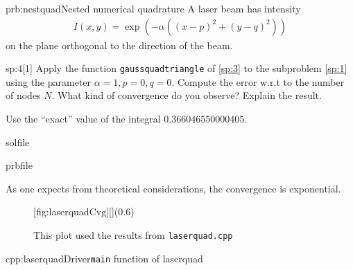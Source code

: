 \begin{samproblem}{prb:nestquad}{Nested numerical quadrature}{
  A laser beam has intensity
  \begin{align*}
    I(x,y) = \exp(- \alpha ((x-p)^2 + (y-q)^2) )
  \end{align*}
  on the plane orthogonal to the direction of the beam.
}
\begin{subproblem}{sp:4}[1]
  Apply the function \verb|gaussquadtriangle| of \ref{sp:3} to the subproblem \ref{sp:1} using the parameter $\alpha = 1, p = 0, q = 0$. 
  Compute the error w.r.t to the number of nodes $N$. What kind of convergence do you observe? Explain the result.
  
  \begin{samhint}
    Use the ``exact'' value of the integral $0.366046550000405$.
  \end{samhint}
  
  \begin{samwriteprbpart}{solfile}
    \begin{writeverbatim}{prbfile}
      \begin{samsolution}
        As one expects from theoretical considerations, the convergence is exponential.
        \begin{figure}[h]
          \centering
          [fig:laserquadCvg][](0.6\textwidth)
          \caption{This plot used the results from \texttt{laserquad.cpp}}
        \end{figure}
        \begin{samcode}[C++-code]{cpp:laserquadDriver}{\texttt{main} function of laserquad}
          \small
        \end{samcode}
     \end{samsolution}
    \end{writeverbatim}
  \end{samwriteprbpart}

\end{subproblem}
\end{samproblem}
